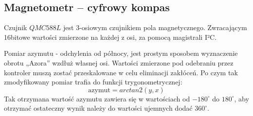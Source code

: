     \subsection{Magnetometr -- cyfrowy kompas}
        \tab Czujnik $QMC588L$ jest 3-osiowym czujnikiem pola magnetycznego. Zwracającym 16bitowe wartości zmierzone na każdej z osi, za pomocą magistrali I²C.
        
        Pomiar azymutu - odchylenia od północy, jest prostym sposobem wyznaczenie obrotu „Azora” wzdłuż własnej osi.
        Wartości zmierzone pod odebraniu przez kontroler muszą zostać przeskalowane w celu eliminacji zakłóceń.
        Po czym tak zmodyfikowany pomiar trafia do  funkcji trygonometrycznej:
        \begin{equation*}
            \text{azymut} = arctan2(y, x)
        \end{equation*}
        Tak otrzymana wartość azymutu zawiera się w wartościach od $-180^\circ$ do $180^\circ$, aby otrzymać ostateczny wynik należy do wartości ujemnych dodać $360^\circ$.
